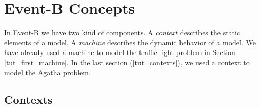 \section{Event-B Concepts}
\label{tut_eventb_concepts}


In Event-B we have two kind of components.
A \emph{context} describes the static elements of a model. A \emph{machine} describes the dynamic behavior of a model. We have already used a machine to model the traffic light problem in Section \ref{tut_first_machine}. In the last section (\ref{tut_contexts}), we used a context to model the Agatha problem.

\subsection{Contexts}
\label{tut_concepts_contexts}

